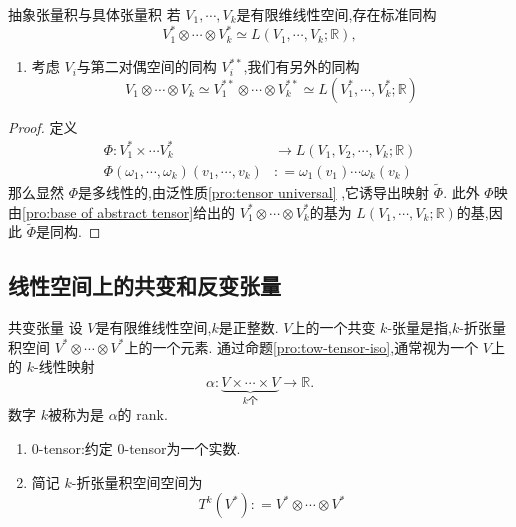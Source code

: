 \documentclass[../../几何与拓扑.tex]{subfiles}
\begin{document}
\begin{proposition}{抽象张量积与具体张量积}\label{pro:tow-tensor-iso}
    若 $ V_1,\cdots ,V_{k} $是有限维线性空间,存在标准同构 $$
    V_1^{*}\otimes \cdots \otimes V_{k}^{*}\simeq L\left( V_1,\cdots ,V_{k};\mathbb{R}  \right), 
    $$ 
\end{proposition}
\begin{remark}
    \begin{enumerate}
        \item 考虑 $ V_{i} $与第二对偶空间的同构 $ V_{i}^{**} $,我们有另外的同构 $$
        V_1\otimes \cdots \otimes V_{k}\simeq V_1^{**}\otimes \cdots \otimes V_{k}^{* * }\simeq  L\left( V_1^{*},\cdots ,V_{k}^{*};\mathbb{R}  \right)
        $$  
    \end{enumerate}
    
\end{remark}
\begin{proof}
    定义 $$
    \begin{aligned}
    \Phi: V_1^{*}\times \cdots V_{k}^{*}& \to  L\left( V_1,V_2,\cdots,V_k;\mathbb{R}  \right)\\ 
     \Phi\left( \omega_1,\cdots ,\omega_{k} \right)\left( v_1,\cdots ,v_{k} \right) & : = \omega_1\left( v_1     \right)\cdots \omega_{k}\left( v_{k} \right)      
    \end{aligned}
    $$那么显然 $ \Phi $是多线性的,由泛性质\ref{pro:tensor universal} ,它诱导出映射 $ \tilde{\Phi} $. 此外 $ \Phi $映由\ref{pro:base of abstract tensor}给出的 $ V_1^{*}\otimes \cdots \otimes V_{k}^{*} $的基为 $ L\left( V_1,\cdots ,V_{k};\mathbb{R}  \right)  $的基,因此 $ \tilde{\Phi} $是同构.   
\end{proof}

\subsection{线性空间上的共变和反变张量}

\begin{definition}{共变张量}
    设 $ V $是有限维线性空间,$ k $是正整数. $ V $上的一个共变 $ k $-张量是指,$ k $-折张量积空间 $ V^{*}\otimes \cdots \otimes V^{*} $上的一个元素.
    通过命题\ref{pro:tow-tensor-iso},通常视为一个 $ V $上的 $ k $-线性映射 $$
    \alpha: \underbrace{V\times \cdots \times V}_{k \text{个}}\to \mathbb{R} .
    $$数字 $ k $被称为是 $ \alpha $的 rank.    
\end{definition}
\begin{remark}
    \begin{enumerate}
        \item 0-tensor:约定 $ 0 $-tensor为一个实数.
        \item 简记 $ k $-折张量积空间空间为 $$
        T^{k}\left( V^{*} \right) : = V^{*}\otimes \cdots \otimes V^{*}
        $$  
    \end{enumerate}
    
\end{remark}
\end{document}
